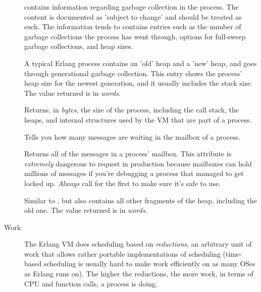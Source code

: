 \documentclass[11pt, oneside]{book}   	%
\begin{document}
\begin{description*}
\begin{description}
			\item[] contains information regarding garbage collection in the process. The content is documented as 'subject to change' and should be treated as such. The information tends to contains entries such as the number of garbage collections the process has went through, options for full-sweep garbage collections, and heap sizes.
			
			\item[] A typical Erlang process contains an 'old' heap and a 'new' heap, and goes through generational garbage collection. This entry shows the process' heap size for the newest generation, and it usually includes the stack size. The value returned is in \emph{words}.
			
			\item[] Returns, in \emph{bytes}, the size of the process, including the call stack, the heaps, and internal structures used by the VM that are part of a process.
			
			\item[] Tells you how many messages are waiting in the mailbox of a process.
			
			\item[] Returns all of the messages in a process' mailbox. This attribute is \emph{extremely} dangerous to request in production because mailboxes can hold millions of messages if you're debugging a process that managed to get locked up. \emph{Always} call for the  first to make sure it's safe to use.
			
			\item[] Similar to , but also contains all other fragments of the heap, including the old one. The value returned is in \emph{words}.
			
			\end{description}
	\item[Work] \hfill
		\begin{description}
			\item[] The Erlang VM does scheduling based on \emph{reductions}, an arbitrary unit of work that allows rather portable implementations of scheduling (time-based scheduling is usually hard to make work efficiently on as many OSes as Erlang runs on). The higher the reductions, the more work, in terms of CPU and function calls, a process is doing. 
		\end{description}
\end{description*}
\end{document}
